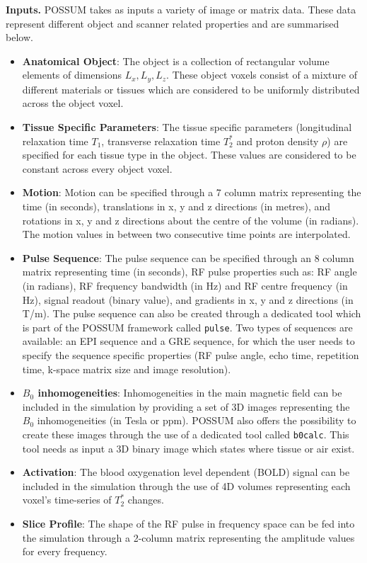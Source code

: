 \textbf{Inputs.} POSSUM takes as inputs a variety of image or matrix data.
These data represent different object and scanner related properties and are summarised below.
\begin{itemize}
    
    \item \textbf{Anatomical Object}: The object is a collection of rectangular volume elements of dimensions $L_x, L_y, L_z$.
    These object voxels consist of a mixture of different materials or tissues which are considered to be uniformly distributed across the object voxel.
    
    \item \textbf{Tissue Specific Parameters}: The tissue specific parameters (longitudinal relaxation time $T_1$, transverse relaxation time $T_2^*$ and proton density $\rho$) are specified for each tissue type in the object.
    These values are considered to be constant across every object voxel.
    
    \item \textbf{Motion}: Motion can be specified through a 7 column matrix representing the time (in seconds), translations in x, y and z directions (in metres), and rotations in x, y and z directions about the centre of the volume (in radians).
    The motion values in between two consecutive time points are interpolated.
    
    \item \textbf{Pulse Sequence}: The pulse sequence can be specified through an 8 column matrix representing time (in seconds), RF pulse properties such as: RF angle (in radians), RF frequency bandwidth (in Hz) and RF centre frequency (in Hz), signal readout (binary value), and gradients in x, y and z directions (in T/m).
    The pulse sequence can also be created through a dedicated tool which is part of the POSSUM framework called \texttt{pulse}.
    Two types of sequences are available: an EPI sequence and a GRE sequence, for which the user needs to specify the sequence specific properties (RF pulse angle, echo time, repetition time, k-space matrix size and image resolution).
    
    \item \textbf{$B_0$ inhomogeneities}: Inhomogeneities in the main magnetic field can be included in the simulation by providing a set of 3D images representing the $B_0$ inhomogeneities (in Tesla or ppm).
    POSSUM also offers the possibility to create these images through the use of a dedicated tool called \texttt{b0calc}.
    This tool needs as input a 3D binary image which states where tissue or air exist.
    
    \item \textbf{Activation}: The blood oxygenation level dependent (BOLD) signal can be included in the simulation through the use of 4D volumes representing each voxel's time-series of $T_2^*$ changes.
    
    \item \textbf{Slice Profile}: The shape of the RF pulse in frequency space can be fed into the simulation through a 2-column matrix representing the amplitude values for every frequency.
    
\end{itemize}

